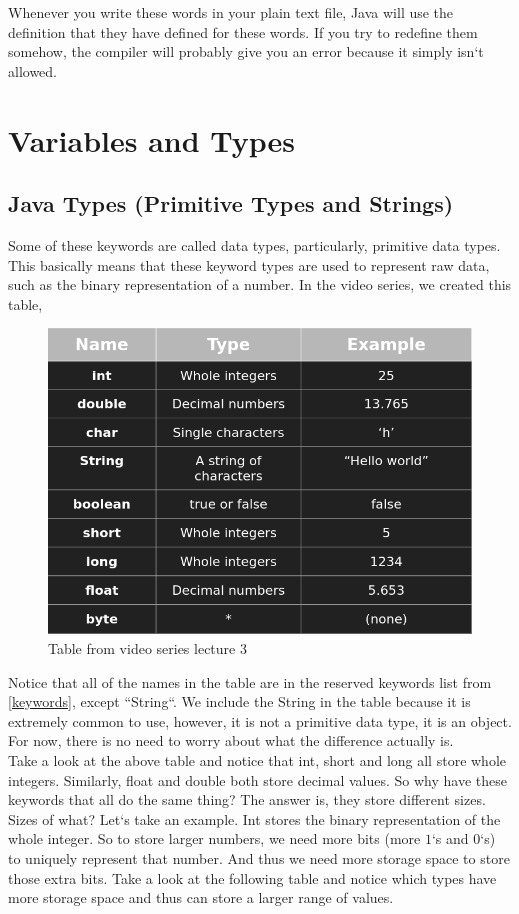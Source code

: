 \documentclass[11]{article}
\begin{document}
Whenever you write these words in your plain text file, Java will use the definition that they have defined for these words. If you try to redefine them somehow, the compiler will probably give you an error because it simply isn`t allowed.\\


\section{Variables and Types}
\subsection{Java Types (Primitive Types and Strings)}
Some of these keywords are called data types, particularly, primitive data types. This basically means that these keyword types are used to represent raw data, such as the binary representation of a number. In the video series, we created this table, 
\begin{figure}[H]
	\centering
	\includegraphics[scale=0.5]{primitives.png}
	\caption{Table from video series lecture 3}
\end{figure}

Notice that all of the names in the table are in the reserved keywords list from \ref{keywords}, except ``String``. We include the String in the table because it is extremely common to use, however, it is not a primitive data type, it is an object. For now, there is no need to worry about what the difference actually is.\\

Take a look at the above table and notice that  int, short and long all store whole integers. Similarly, float and double both store decimal values. So why have these keywords that all do the same thing? The answer is, they store different sizes. Sizes of what? Let`s take an example. Int stores the binary representation of the whole integer. So to store larger numbers, we need more bits (more $1$`s and $0$`s) to uniquely represent that number. And thus we need more storage space to store those extra bits. Take a look at the following table and notice which types have more storage space and thus can store a larger range of values.
\end{document}

